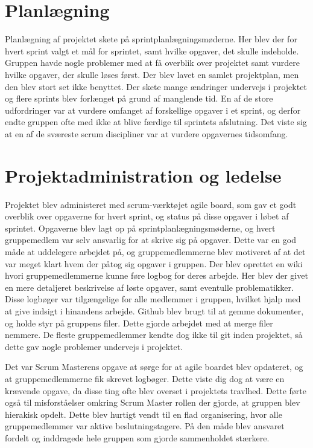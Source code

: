 \section*{Planlægning}
Planlægning af projektet skete på sprintplanlægningsmøderne. Her blev der for hvert sprint valgt et mål for sprintet, samt hvilke opgaver, det skulle indeholde.
Gruppen havde nogle problemer med at få overblik over projektet samt vurdere hvilke opgaver, der skulle løses først. Der blev lavet en samlet projektplan,
men den blev stort set ikke benyttet.
Der skete mange ændringer undervejs i projektet og flere sprints blev forlænget på grund af manglende tid. En af de store udfordringer var at vurdere omfanget
af forskellige opgaver i et sprint, og derfor endte gruppen ofte med ikke at blive færdige til sprintets afslutning. Det viste sig at en af de sværeste
scrum discipliner var at vurdere opgavernes tidsomfang.

\section*{Projektadministration og ledelse}
Projektet blev administeret med scrum-værktøjet agile board, som gav et godt overblik over opgaverne for hvert sprint, og status på disse opgaver
i løbet af sprintet. Opgaverne blev lagt op på sprintplanlægningsmøderne, og hvert gruppemedlem var selv ansvarlig for at skrive sig på opgaver.
Dette var en god måde at uddelegere arbejdet på, og gruppemedlemmerne blev motiveret af at det var meget klart hvem der påtog sig opgaver i gruppen. 
Der blev oprettet en wiki hvori gruppemedlemmerne kunne føre logbog for deres arbejde. Her blev der givet en mere detaljeret beskrivelse af løste opgaver,
samt eventulle problematikker. Disse logbøger var tilgængelige for alle medlemmer i gruppen, hvilket hjalp med at give indsigt i hinandens arbejde.
Github blev brugt til at gemme dokumenter, og holde styr på gruppens filer. Dette gjorde arbejdet med at merge filer nemmere. De fleste gruppemedlemmer
kendte dog ikke til git inden projektet, så dette gav nogle problemer undervejs i projektet.

Det var Scrum Masterens opgave at sørge for at agile boardet blev opdateret, og at gruppemedlemmerne fik skrevet logbøger. Dette viste dig dog at være en krævende
opgave, da disse ting ofte blev overset i projektets travlhed. 
Dette førte også til misforståelser omkring Scrum Master rollen der gjorde, at gruppen blev hierakisk opdelt. Dette blev hurtigt vendt til en flad organisering,
hvor alle gruppemedlemmer var aktive beslutningstagere. På den måde blev ansvaret fordelt og inddragede hele gruppen som gjorde sammenholdet stærkere.

